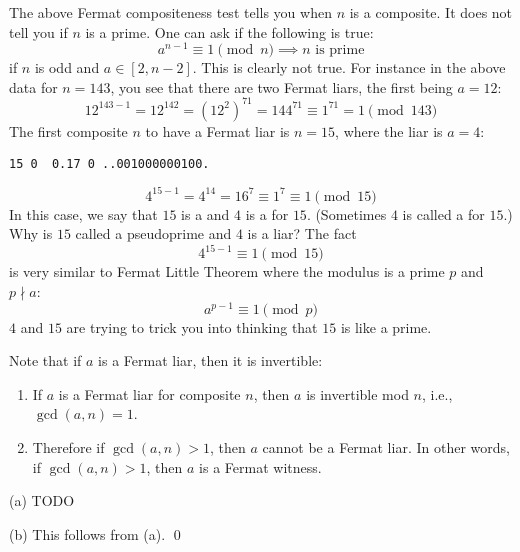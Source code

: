 


The above Fermat compositeness test tells you when $n$ is a composite.
It does not tell you if $n$ is a prime.
One can ask if the following is true: 
\[
a^{n-1} \equiv 1 \pmod{n} \implies n \text{ is prime}
\]
if $n$ is odd and $a \in [2, n-2]$.
This is clearly not true.
For instance in the above data for $n = 143$, you see that
there are two Fermat liars, the first being $a = 12$:
\[
12^{143 - 1} = 12^{142} = (12^2)^{71} = 144^{71} \equiv 1^{71} = 1 \pmod{143}
\]
The first composite $n$ to have a Fermat liar is $n = 15$, where the liar is $a = 4$:
\begin{Verbatim}[frame=single,fontsize=\footnotesize]
15 0  0.17 0 ..001000000100.
\end{Verbatim}
\[
4^{15 - 1} = 4^{14} = 16^7 \equiv 1^7 \equiv 1 \pmod{15} 
\]  
In this case,
we say that $15$ is a
and
$4$ is a
for $15$.
(Sometimes $4$ is called a
 for $15$.)
Why is $15$ called a pseudoprime and $4$ is a liar?
The fact
\[
4^{15 - 1} \equiv 1 \pmod{15} 
\]
is very similar to Fermat Little Theorem where the modulus is a prime $p$ and $p \nmid a$:
\[
a^{p - 1} \equiv 1 \pmod{p} 
\]
$4$ and $15$ are trying to trick you into thinking that $15$ is like a prime. 

Note that if $a$ is a Fermat liar, then it is invertible:

\begin{prop}
  \mbox{}
  \begin{enumerate}[nosep,label=\textnormal{(\alph*)}]
    \item
      If $a$ is a Fermat liar for composite $n$,
      then $a$ is invertible mod $n$, i.e., $\gcd(a, n) = 1$.
    \item
      Therefore if $\gcd(a, n) > 1$, then $a$ cannot be a Fermat liar.
      In other words, if $\gcd(a, n) > 1$, then $a$ is a Fermat witness.
  \end{enumerate}
\end{prop}
\proof
(a)
TODO

(b) This follows from (a).
\qed

